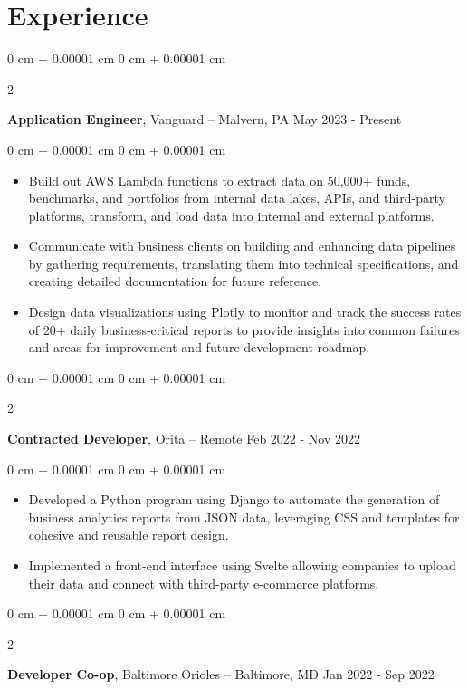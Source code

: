 \documentclass[10pt, letterpaper]{article}
\newenvironment{highlights}{
    \begin{itemize}[
        topsep=0.10 cm,
        parsep=0.10 cm,
        partopsep=0pt,
        itemsep=0pt,
        leftmargin=0 cm + 10pt
    ]
}{
    \end{itemize}
} %
\newenvironment{onecolentry}{
    \begin{adjustwidth}{
        0 cm + 0.00001 cm
    }{
        0 cm + 0.00001 cm
    }
}{
    \end{adjustwidth}
} %
\newenvironment{twocolentry}[2][]{
    \onecolentry
    \def\secondColumn{#2}
    \setcolumnwidth{\fill, 4.5 cm}
    \begin{paracol}{2}
}{
    \switchcolumn \raggedleft \secondColumn
    \end{paracol}
    \endonecolentry
} %
\begin{document}
    \section{Experience}
    \begin{twocolentry}{
        May 2023 - Present
    }
    \textbf{Application Engineer}, Vanguard -- Malvern, PA \end{twocolentry}
    \vspace{0.10 cm}
    \begin{onecolentry}
      \begin{highlights}
        \item Build out AWS Lambda functions to extract data on 50,000+ funds, benchmarks, and portfolios from internal data lakes, APIs, and third-party platforms, transform, and load data into internal and external platforms.
        \item Communicate with business clients on building and enhancing data pipelines by gathering requirements, translating them into technical specifications, and creating detailed documentation for future reference.
        \item Design data visualizations using Plotly to monitor and track the success rates of 20+ daily business-critical reports to provide insights into common failures and areas for improvement and future development roadmap.
      \end{highlights}
    \end{onecolentry}
    \vspace{0.2 cm}
    \begin{twocolentry}{
        Feb 2022 - Nov 2022
    }
    \textbf{Contracted Developer}, Orita -- Remote \end{twocolentry}
    \vspace{0.10 cm}
    \begin{onecolentry}
      \begin{highlights}
        \item Developed a Python program using Django to automate the generation of business analytics reports from JSON data, leveraging CSS and templates for cohesive and reusable report design.
        \item Implemented a front-end interface using Svelte allowing companies to upload their data and connect with third-party e-commerce platforms.
      \end{highlights}
    \end{onecolentry}
    \vspace{0.2 cm}
    \begin{twocolentry}{
        Jan 2022 - Sep 2022
    }
    \textbf{Developer Co-op}, Baltimore Orioles -- Baltimore, MD \end{twocolentry}
\end{document}
